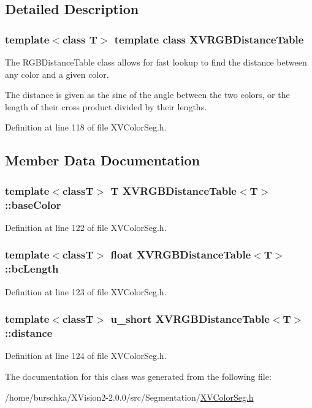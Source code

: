 \subsection{Detailed Description}
\subsubsection*{template$<$class T$>$  template class XVRGBDistance\-Table}

The RGBDistance\-Table class allows for fast lookup to find the distance between any color and a given color.

The distance is given as the sine of the angle between the two colors, or the length of their cross product divided by their lengths. 



Definition at line 118 of file XVColor\-Seg.h.

\subsection{Member Data Documentation}
\label{XVRGBDistanceTable_n0}
\hypertarget{class_XVRGBDistanceTable_n0}{
\subsubsection[baseColor]{\setlength{\rightskip}{0pt plus 5cm}template$<$classT$>$ T XVRGBDistance\-Table$<$T$>$::base\-Color}}




Definition at line 122 of file XVColor\-Seg.h.\label{XVRGBDistanceTable_n1}
\hypertarget{class_XVRGBDistanceTable_n1}{
\subsubsection[bcLength]{\setlength{\rightskip}{0pt plus 5cm}template$<$classT$>$ float XVRGBDistance\-Table$<$T$>$::bc\-Length}}




Definition at line 123 of file XVColor\-Seg.h.\label{XVRGBDistanceTable_n2}
\hypertarget{class_XVRGBDistanceTable_n2}{
\subsubsection[distance]{\setlength{\rightskip}{0pt plus 5cm}template$<$classT$>$ u\_\-short XVRGBDistance\-Table$<$T$>$::distance}}




Definition at line 124 of file XVColor\-Seg.h.

The documentation for this class was generated from the following file:\begin{CompactItemize}
\item 
/home/burschka/XVision2-2.0.0/src/Segmentation/\hyperlink{XVColorSeg.h-source}{XVColor\-Seg.h}\end{CompactItemize}
